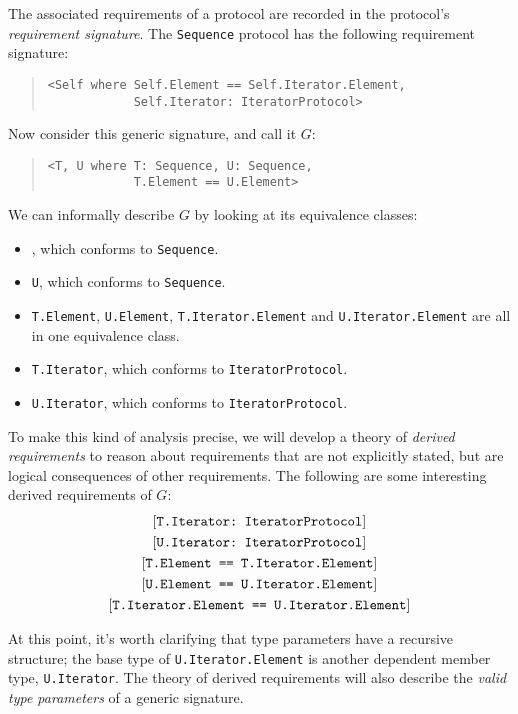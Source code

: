 \documentclass[../generics]{subfiles}
\begin{document}
The associated requirements of a protocol are recorded in the protocol's \emph{requirement signature}. The \texttt{Sequence} protocol has the following requirement signature:
\begin{quote}
\begin{verbatim}
<Self where Self.Element == Self.Iterator.Element,
            Self.Iterator: IteratorProtocol>
\end{verbatim}
\end{quote}
Now consider this generic signature, and call it $G$:
\begin{quote}
\begin{verbatim}
<T, U where T: Sequence, U: Sequence,
            T.Element == U.Element>
\end{verbatim}
\end{quote}
We can informally describe $G$ by looking at its equivalence classes:
\begin{itemize}
\item \tT, which conforms to \texttt{Sequence}.
\item \texttt{U}, which conforms to \texttt{Sequence}.
\item \texttt{T.Element}, \texttt{U.Element}, \texttt{T.Iterator.Element} and \texttt{U.Iterator.Element} are all in one equivalence class.
\item \texttt{T.Iterator}, which conforms to \texttt{IteratorProtocol}.
\item \texttt{U.Iterator}, which conforms to \texttt{IteratorProtocol}.
\end{itemize}
To make this kind of analysis precise, we will develop a theory of \emph{derived requirements} to reason about requirements that are not explicitly stated, but are logical consequences of other requirements. The following are some interesting derived requirements of $G$:
\begin{gather*}
\ConfReq{T.Iterator}{IteratorProtocol}\\
\ConfReq{U.Iterator}{IteratorProtocol}\\
\SameReq{T.Element}{T.Iterator.Element}\\
\SameReq{U.Element}{U.Iterator.Element}\\
\SameReq{T.Iterator.Element}{U.Iterator.Element}
\end{gather*}

At this point, it's worth clarifying that type parameters have a recursive structure; the base type of \texttt{U.Iterator.Element} is another dependent member type, \texttt{U.Iterator}. The theory of derived requirements will also describe the \emph{valid type parameters} of a generic signature.
\end{document}

